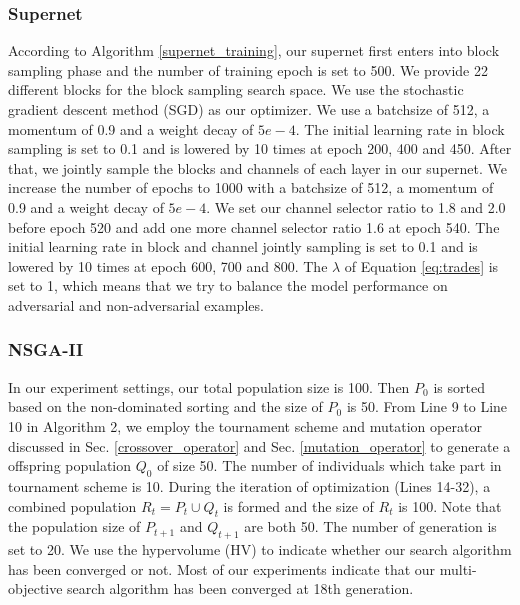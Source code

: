 \documentclass[journal]{IEEEtran}
\begin{document}
\subsubsection{\textbf{Supernet}}
According to Algorithm \ref{supernet_training}, our supernet first enters into block sampling phase and the number of training epoch is set to 500. We provide 22 different blocks for the block sampling search space. We use the stochastic gradient descent method (SGD) as our optimizer. We use a batchsize of 512, a momentum of 0.9 and a weight decay of $5e-4$. The initial learning rate in block sampling is set to 0.1 and is lowered by 10 times at epoch 200, 400 and 450. After that, we jointly sample the blocks and channels of each layer in our supernet. We increase the number of epochs to 1000 with a batchsize of 512, a momentum of 0.9 and a weight decay of $5e-4$. We set our channel selector ratio to 1.8 and 2.0 before epoch 520 and add one more channel selector ratio 1.6 at epoch 540. The initial learning rate in block and channel jointly sampling is set to 0.1 and is lowered by 10 times at epoch 600, 700 and 800. The $\lambda$ of Equation \ref{eq:trades} is set to 1, which means that we try to balance the model performance on adversarial and non-adversarial examples.

\subsubsection{\textbf{NSGA-II}}
In our experiment settings, our total population size is 100. Then $P_{0}$ is sorted based on the non-dominated sorting and the size of $P_{0}$ is 50. From Line 9 to Line 10 in Algorithm 2, we employ the tournament scheme and mutation operator discussed in Sec. \ref{crossover_operator} and Sec. \ref{mutation_operator} to generate a offspring population $Q_{0}$ of size 50. The number of individuals which take part in tournament scheme is 10. During the iteration of optimization (Lines 14-32), a combined population $R_{t} = P_{t} \cup Q_{t}$ is formed and the size of $R_{t}$ is 100. Note that the population size of $P_{t+1}$ and $Q_{t+1}$ are both 50. The number of generation is set to 20. We use the hypervolume (HV) to indicate whether our search algorithm has been converged or not. Most of our experiments indicate that our multi-objective search algorithm has been converged at 18th generation. 
\end{document}
